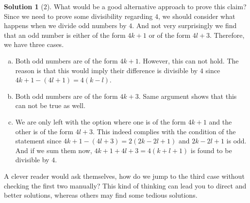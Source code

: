 \documentclass[a4paper, 12pt, leqno]{article}
\theoremstyle{definition}
\newtheorem*{solution}{Solution}
\theoremstyle{remark}
\begin{document}
		\begin{solution}[$2$]
			What would be a good alternative approach to prove this claim? Since we need to prove some divisibility regarding $4$, we should consider what happens when we divide odd numbers by $4$. And not very surprisingly we find that an odd number is either of the form $4k+1$ or of the form $4l+3$. Therefore, we have three cases.
				\begin{enumerate}[(a)]
					\item Both odd numbers are of the form $4k+1$. However, this can not hold. The reason is that this would imply their difference is divisible by $4$ since $4k+1-(4l+1)=4(k-l)$.
					\item Both odd numbers are of the form $4k+3$. Same argument shows that this can not be true as well.
					\item We are only left with the option where one is of the form $4k+1$ and the other is of the form $4l+3$. This indeed complies with the condition of the statement since $4k+1-(4l+3)=2(2k-2l+1)$ and $2k-2l+1$ is odd. And if we sum them now, $4k+1+4l+3=4(k+l+1)$ is found to be divisible by $4$.
				\end{enumerate}
		\end{solution}
	A clever reader would ask themselves, how do we jump to the third case without checking the first two manually? This kind of thinking can lead you to direct and better solutions, whereas others may find some tedious solutions.
\end{document}
